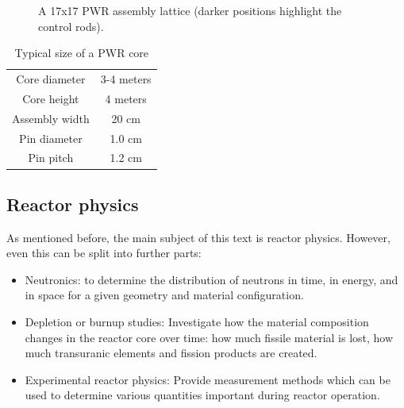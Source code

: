 \begin{figure}[ht!]
\protect {}\protect
\caption{\label{fig:assembly} \footnotesize{A 17x17 PWR assembly lattice (darker positions highlight the control rods).}}
\end{figure}

\begin{table}\caption{Typical size of a PWR core}\label{table:pwrsize}
\begin{tabular}{c c}
Core diameter & 3-4 meters \\
Core height & 4 meters \\
Assembly width & 20 cm \\
Pin diameter & 1.0 cm \\
Pin pitch & 1.2 cm
\end{tabular}
\end{table}


\subsection{Reactor physics}

As mentioned before, the main subject of this text is reactor physics. However, even this can be split into further parts:

\begin{itemize}
\item Neutronics: to determine the distribution of neutrons in time, in energy, and in space for a given geometry and material configuration.
\item Depletion or burnup studies: Investigate how the material composition changes in the reactor core over time: how much fissile material is lost, how much transuranic elements and fission products are created. 
\item Experimental reactor physics: Provide measurement methods which can be used to determine various quantities important during reactor operation.
\end{itemize}

